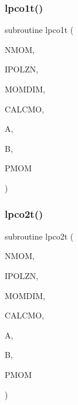 \subsubsection{\texorpdfstring{lpco1t()}{lpco1t()}}
{\footnotesize\ttfamily subroutine lpco1t (\begin{DoxyParamCaption}\item[{integer}]{N\+M\+OM,  }\item[{integer}]{I\+P\+O\+L\+ZN,  }\item[{integer}]{M\+O\+M\+D\+IM,  }\item[{logical, dimension( $\ast$ )}]{C\+A\+L\+C\+MO,  }\item[{complex, dimension( $\ast$ )}]{A,  }\item[{complex, dimension( $\ast$ )}]{B,  }\item[{real, dimension( 0\+:momdim, $\ast$ )}]{P\+M\+OM }\end{DoxyParamCaption})}

\mbox{\label{wiscombe__miev__1_2_m_i_e_v0_8f_af491bde683b4a07ee245f9c3e53c6894}} 
\subsubsection{\texorpdfstring{lpco2t()}{lpco2t()}}
{\footnotesize\ttfamily subroutine lpco2t (\begin{DoxyParamCaption}\item[{integer}]{N\+M\+OM,  }\item[{integer}]{I\+P\+O\+L\+ZN,  }\item[{integer}]{M\+O\+M\+D\+IM,  }\item[{logical, dimension( $\ast$ )}]{C\+A\+L\+C\+MO,  }\item[{complex, dimension( $\ast$ )}]{A,  }\item[{complex, dimension( $\ast$ )}]{B,  }\item[{real, dimension( 0\+:momdim, $\ast$ )}]{P\+M\+OM }\end{DoxyParamCaption})}

\mbox{\label{wiscombe__miev__1_2_m_i_e_v0_8f_a8f1c192fc6a73a6b9e55d5a52de1f201}} 
